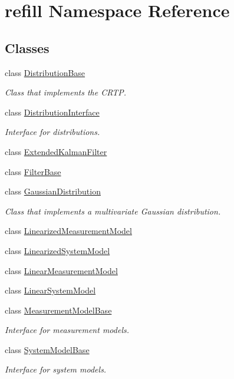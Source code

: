 \hypertarget{namespacerefill}{}\section{refill Namespace Reference}
\label{namespacerefill}
\subsection*{Classes}
\begin{DoxyCompactItemize}
\item 
class \hyperlink{classrefill_1_1DistributionBase}{Distribution\+Base}
\begin{DoxyCompactList}\small\item\em Class that implements the C\+R\+TP. \end{DoxyCompactList}\item 
class \hyperlink{classrefill_1_1DistributionInterface}{Distribution\+Interface}
\begin{DoxyCompactList}\small\item\em Interface for distributions. \end{DoxyCompactList}\item 
class \hyperlink{classrefill_1_1ExtendedKalmanFilter}{Extended\+Kalman\+Filter}
\item 
class \hyperlink{classrefill_1_1FilterBase}{Filter\+Base}
\item 
class \hyperlink{classrefill_1_1GaussianDistribution}{Gaussian\+Distribution}
\begin{DoxyCompactList}\small\item\em Class that implements a multivariate Gaussian distribution. \end{DoxyCompactList}\item 
class \hyperlink{classrefill_1_1LinearizedMeasurementModel}{Linearized\+Measurement\+Model}
\item 
class \hyperlink{classrefill_1_1LinearizedSystemModel}{Linearized\+System\+Model}
\item 
class \hyperlink{classrefill_1_1LinearMeasurementModel}{Linear\+Measurement\+Model}
\item 
class \hyperlink{classrefill_1_1LinearSystemModel}{Linear\+System\+Model}
\item 
class \hyperlink{classrefill_1_1MeasurementModelBase}{Measurement\+Model\+Base}
\begin{DoxyCompactList}\small\item\em Interface for measurement models. \end{DoxyCompactList}\item 
class \hyperlink{classrefill_1_1SystemModelBase}{System\+Model\+Base}
\begin{DoxyCompactList}\small\item\em Interface for system models. \end{DoxyCompactList}\end{DoxyCompactItemize}
